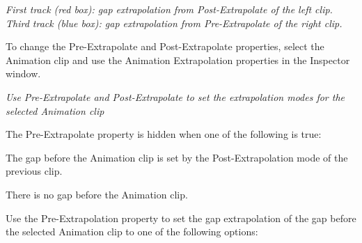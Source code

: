 {\itshape First track (red box)\+: gap extrapolation from Post-\/\+Extrapolate of the left clip. Third track (blue box)\+: gap extrapolation from Pre-\/\+Extrapolate of the right clip.}

To change the Pre-\/\+Extrapolate and Post-\/\+Extrapolate properties, select the Animation clip and use the Animation Extrapolation properties in the Inspector window.



{\itshape Use Pre-\/\+Extrapolate and Post-\/\+Extrapolate to set the extrapolation modes for the selected Animation clip}

The Pre-\/\+Extrapolate property is hidden when one of the following is true\+:


\begin{DoxyItemize}
\item The gap before the Animation clip is set by the Post-\/\+Extrapolation mode of the previous clip.
\item There is no gap before the Animation clip.
\end{DoxyItemize}

Use the Pre-\/\+Extrapolation property to set the gap extrapolation of the gap before the selected Animation clip to one of the following options\+:


